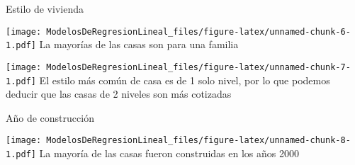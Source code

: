 \documentclass[
]{article}
\newenvironment{Shaded}{\begin{snugshade}}{\end{snugshade}}
\newcommand{\FunctionTok}[1]{\textcolor[rgb]{0.00,0.00,0.00}{#1}}
\newcommand{\NormalTok}[1]{#1}
\newcommand{\OtherTok}[1]{\textcolor[rgb]{0.56,0.35,0.01}{#1}}
\newcommand{\SpecialCharTok}[1]{\textcolor[rgb]{0.00,0.00,0.00}{#1}}
\newcommand{\StringTok}[1]{\textcolor[rgb]{0.31,0.60,0.02}{#1}}
\begin{document}
Estilo de vivienda

\begin{Shaded}
\end{Shaded}

\texttt{[image: ModelosDeRegresionLineal\_files/figure-latex/unnamed-chunk-6-1.pdf]}
La mayorías de las casas son para una familia

\begin{Shaded}
\end{Shaded}

\texttt{[image: ModelosDeRegresionLineal\_files/figure-latex/unnamed-chunk-7-1.pdf]}
El estilo más común de casa es de 1 solo nivel, por lo que podemos
deducir que las casas de 2 niveles son más cotizadas

Año de construcción

\begin{Shaded}
\end{Shaded}

\texttt{[image: ModelosDeRegresionLineal\_files/figure-latex/unnamed-chunk-8-1.pdf]}
La mayoría de las casas fueron construidas en los años 2000
\end{document}
